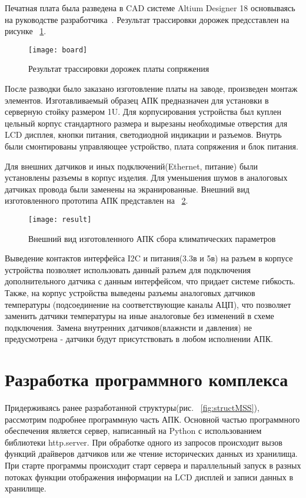 Печатная плата была разведена в CAD системе Altium Designer 18 основываясь на руководстве разработчика~\cite{altium}. 
Результат трассировки дорожек предсставлен на рисунке ~\ref{fig:board}.
\begin{figure}[H]
	\centering
	\texttt{[image: board]}
	\caption{Результат трассировки дорожек платы сопряжения}
	\label{fig:board}
\end{figure}

После разводки было заказано изготовление платы на заводе, произведен монтаж элементов.  
Изготавливаемый образец АПК предназначен для установки в серверную стойку размером 1U. Для корпусирования устройства был куплен цельный корпус стандартного размера и вырезаны необходимые отверстия для LCD дисплея, кнопки питания, светодиодной индикации и разъемов. Внутрь были смонтированы управляющее устройство, плата сопряжения и блок питания. 

Для внешних датчиков и иных подключений(Ethernet, питание) были установлены разъемы в корпус изделия. Для уменьшения шумов в аналоговых датчиках провода были заменены на экранированные. 
Внешний вид изготовленного прототипа АПК представлен на ~\ref{fig:result}.

\begin{figure}[h]
	\centering
	\texttt{[image: result]}
	\caption{Внешний вид изготовленного АПК сбора климатических параметров}
	\label{fig:result}
\end{figure} 

Выведение контактов интерфейса I2C и питания(3.3в и 5в) на разъем в корпусе устройства позволяет использовать данный разъем для подключения дополнительного датчика с данным интерфейсом, что придает системе гибкость. Также, на корпус устройства выведены разъемы аналоговых датчиков температуры (подсоединение на соответствующие каналы АЦП), что позволяет заменить датчики температуры на иные аналоговые без изменений в схеме подключения. Замена внутренних датчиков(влажнсти и давления) не предусмотрена - датчики будут присутствовать в любом исполнении АПК. 


\section{Разработка программного комплекса}
Придерживаясь ранее разработанной структуры(рис. ~\ref{fig:structMSS}), рассмотрим подробнее программную часть АПК. 
Основной частью программного обеспечения является сервер, написанный на Python с использованием библиотеки http.server. При обработке одного из запросов происходит вызов функций драйверов датчиков или же чтение исторических данных из хранилища.
При старте программы происходит старт сервера и параллельный запуск в разных потоках функции отображения информации на LCD дисплей и записи данных в хранилище. 

